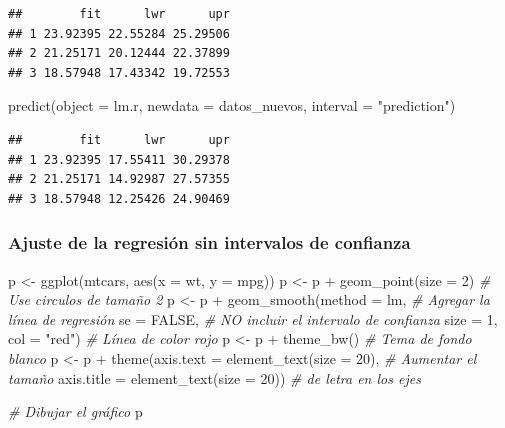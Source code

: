 \documentclass[
  12pt,
]{book}
\newenvironment{Shaded}{\begin{snugshade}}{\end{snugshade}}
\newcommand{\AttributeTok}[1]{\textcolor[rgb]{0.77,0.63,0.00}{#1}}
\newcommand{\CommentTok}[1]{\textcolor[rgb]{0.56,0.35,0.01}{\textit{#1}}}
\newcommand{\ConstantTok}[1]{\textcolor[rgb]{0.00,0.00,0.00}{#1}}
\newcommand{\DecValTok}[1]{\textcolor[rgb]{0.00,0.00,0.81}{#1}}
\newcommand{\FunctionTok}[1]{\textcolor[rgb]{0.00,0.00,0.00}{#1}}
\newcommand{\NormalTok}[1]{#1}
\newcommand{\OtherTok}[1]{\textcolor[rgb]{0.56,0.35,0.01}{#1}}
\newcommand{\SpecialCharTok}[1]{\textcolor[rgb]{0.00,0.00,0.00}{#1}}
\newcommand{\StringTok}[1]{\textcolor[rgb]{0.31,0.60,0.02}{#1}}
\begin{document}
\begin{verbatim}
##        fit      lwr      upr
## 1 23.92395 22.55284 25.29506
## 2 21.25171 20.12444 22.37899
## 3 18.57948 17.43342 19.72553
\end{verbatim}

\begin{Shaded}
\begin{Highlighting}[]
\FunctionTok{predict}\NormalTok{(}\AttributeTok{object =}\NormalTok{ lm.r, }\AttributeTok{newdata =}\NormalTok{ datos\_nuevos, }\AttributeTok{interval =} \StringTok{"prediction"}\NormalTok{)}
\end{Highlighting}
\end{Shaded}

\begin{verbatim}
##        fit      lwr      upr
## 1 23.92395 17.55411 30.29378
## 2 21.25171 14.92987 27.57355
## 3 18.57948 12.25426 24.90469
\end{verbatim}

\hypertarget{ajuste-de-la-regresiuxf3n-sin-intervalos-de-confianza}{%
\subsubsection{Ajuste de la regresión sin intervalos de
confianza}\label{ajuste-de-la-regresiuxf3n-sin-intervalos-de-confianza}}

\begin{Shaded}
\begin{Highlighting}[]
\NormalTok{p }\OtherTok{\textless{}{-}} \FunctionTok{ggplot}\NormalTok{(mtcars, }\FunctionTok{aes}\NormalTok{(}\AttributeTok{x =}\NormalTok{ wt, }\AttributeTok{y =}\NormalTok{ mpg)) }
\NormalTok{p }\OtherTok{\textless{}{-}}\NormalTok{ p }\SpecialCharTok{+} \FunctionTok{geom\_point}\NormalTok{(}\AttributeTok{size =} \DecValTok{2}\NormalTok{)       }\CommentTok{\# Use circulos de tamaño 2}
\NormalTok{p }\OtherTok{\textless{}{-}}\NormalTok{ p }\SpecialCharTok{+} \FunctionTok{geom\_smooth}\NormalTok{(}\AttributeTok{method =}\NormalTok{ lm,   }\CommentTok{\# Agregar la línea de regresión }
              \AttributeTok{se =} \ConstantTok{FALSE}\NormalTok{,           }\CommentTok{\# NO incluir el intervalo de confianza   }
              \AttributeTok{size =} \DecValTok{1}\NormalTok{,}
              \AttributeTok{col =} \StringTok{"red"}\NormalTok{)          }\CommentTok{\# Línea de color rojo }
\NormalTok{p }\OtherTok{\textless{}{-}}\NormalTok{ p }\SpecialCharTok{+} \FunctionTok{theme\_bw}\NormalTok{()                 }\CommentTok{\# Tema de fondo blanco}
\NormalTok{p }\OtherTok{\textless{}{-}}\NormalTok{ p }\SpecialCharTok{+} \FunctionTok{theme}\NormalTok{(}\AttributeTok{axis.text =} \FunctionTok{element\_text}\NormalTok{(}\AttributeTok{size =} \DecValTok{20}\NormalTok{),  }\CommentTok{\# Aumentar el tamaño }
               \AttributeTok{axis.title =} \FunctionTok{element\_text}\NormalTok{(}\AttributeTok{size =} \DecValTok{20}\NormalTok{)) }\CommentTok{\# de letra en los ejes}

\CommentTok{\# Dibujar el gráfico}
\NormalTok{p   }
\end{Highlighting}
\end{Shaded}
\end{document}
